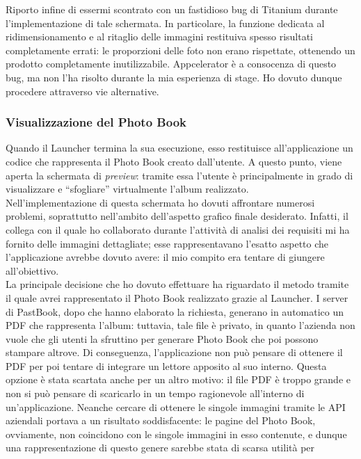 				\noindent Riporto infine di essermi scontrato con un fastidioso bug di Titanium durante l'implementazione di tale
				schermata. In particolare, la funzione dedicata al ridimensionamento e al ritaglio delle immagini restituiva spesso
				risultati completamente errati: le proporzioni delle foto non erano rispettate, ottenendo un prodotto
				completamente inutilizzabile. Appcelerator è a consocenza di questo bug, ma non l'ha risolto durante la mia
				esperienza di stage. Ho dovuto dunque procedere attraverso vie alternative.
			\subsubsection{Visualizzazione del Photo Book}
				Quando il Launcher termina la sua esecuzione, esso restituisce all'applicazione un codice che rappresenta il Photo
				Book creato dall'utente. A questo punto, viene aperta la schermata di \emph{preview}: tramite essa l'utente è 
				principalmente in grado di visualizzare e “sfogliare” virtualmente l'album realizzato.\\
				Nell'implementazione di questa schermata ho dovuti affrontare numerosi problemi, soprattutto nell'ambito dell'aspetto
				grafico finale desiderato. Infatti, il collega con il quale ho collaborato durante l'attività di analisi dei
				requisiti mi ha fornito delle immagini dettagliate; esse rappresentavano l'esatto aspetto che l'applicazione avrebbe
				dovuto avere: il mio compito era tentare di giungere all'obiettivo.\\
				La principale decisione che ho dovuto effettuare ha riguardato il metodo tramite il quale avrei rappresentato il
				Photo Book realizzato grazie al Launcher. I server di PastBook, dopo che hanno elaborato la richiesta, generano in
				automatico un PDF che rappresenta l'album: tuttavia, tale file è privato, in quanto l'azienda non vuole che gli utenti
				la sfruttino per generare Photo Book che poi possono stampare altrove. Di conseguenza, l'applicazione
				non può pensare di ottenere il PDF per poi tentare di integrare un lettore apposito al suo interno. Questa opzione
				è stata scartata anche per un altro motivo: il file PDF è troppo grande e non si può pensare di scaricarlo in un
				tempo ragionevole all'interno di un'applicazione. Neanche cercare di ottenere le singole immagini tramite le API
				aziendali portava a un risultato soddisfacente: le pagine del Photo Book, ovviamente, non coincidono con le singole
				immagini in esso contenute, e dunque una rappresentazione di questo genere sarebbe stata di scarsa utilità per
